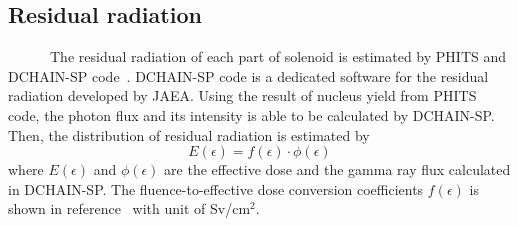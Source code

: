   \subsection{Residual radiation}
~~~~~~The residual radiation of each part of solenoid is estimated by PHITS and DCHAIN-SP code~\cite{dchain}.
DCHAIN-SP code is a dedicated software for the residual radiation developed by JAEA.
Using the result of nucleus yield from PHITS code, the photon flux and its intensity is able to be calculated by DCHAIN-SP.
Then, the distribution of residual radiation is estimated by
\begin{equation}
 E(\epsilon) = f(\epsilon) \cdot \phi(\epsilon)
\end{equation}
where $E(\epsilon)$ and $\phi(\epsilon)$ are the effective dose and the gamma ray flux calculated in DCHAIN-SP.
The fluence-to-effective dose conversion coefficients $f(\epsilon)$ is shown in reference~\cite{flco} with unit of Sv/cm$^2$.

